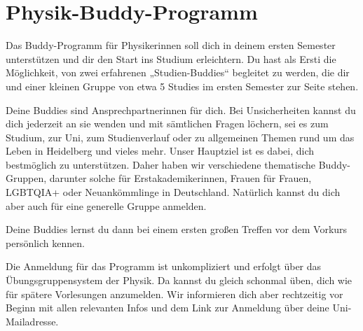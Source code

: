 \section{Physik-Buddy-Programm}
Das Buddy-Programm für Physikerinnen soll dich in deinem ersten Semester unterstützen und dir den Start ins Studium erleichtern. Du hast als Ersti die Möglichkeit, von zwei erfahrenen „Studien-Buddies“ begleitet zu werden, die dir und einer kleinen Gruppe von etwa 5 Studies im ersten Semester zur Seite stehen. 

Deine Buddies sind Ansprechpartnerinnen für dich. Bei Unsicherheiten kannst du dich jederzeit an sie wenden und mit sämtlichen Fragen löchern, sei es zum Studium, zur Uni, zum Studienverlauf oder zu allgemeinen Themen rund um das Leben in Heidelberg und vieles mehr. Unser Hauptziel ist es dabei, dich bestmöglich zu unterstützen. Daher haben wir verschiedene thematische Buddy-Gruppen, darunter solche für Erstakademikerinnen, Frauen für Frauen, LGBTQIA+ oder Neuankömmlinge in Deutschland. Natürlich kannst du dich aber auch für eine generelle Gruppe anmelden.

Deine Buddies lernst du dann bei einem ersten großen Treffen vor dem Vorkurs persönlich kennen.

Die Anmeldung für das Programm ist unkompliziert und erfolgt über das Übungsgruppensystem der Physik. Da kannst du gleich schonmal üben, dich wie für spätere Vorlesungen anzumelden. Wir informieren dich aber rechtzeitig vor Beginn mit allen relevanten Infos und dem Link zur Anmeldung über deine Uni-Mailadresse.
